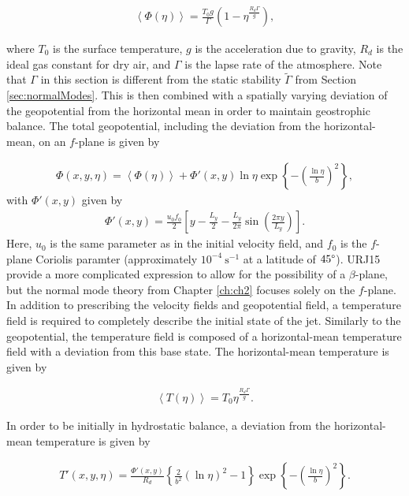 \begin{align}
\left\langle\Phi(\eta)\right\rangle = \frac{T_0 g}{\Gamma}\left(1 - \eta^{\frac{R_d \Gamma}{g}}\right),
\end{align}

where $T_0$ is the surface temperature, $g$ is the acceleration due to gravity, $R_d$ is the ideal gas constant for dry air, and $\Gamma$ is the lapse rate of the atmosphere. Note that $\Gamma$ in this section is different from the static stability $\tilde{\Gamma}$ from Section \ref{sec:normalModes}. This is then combined with a spatially varying deviation of the geopotential from the horizontal mean in order to maintain geostrophic balance. The total geopotential, including the deviation from the horizontal-mean, on an $f$-plane is given by

\begin{align}
\Phi(x,y,\eta) =\left\langle\Phi(\eta)\right\rangle +  \Phi'(x,y)\ln{\eta} \exp{\left\{ -\left(\frac{\ln{\eta}}{b}\right)^2\right\}},
\end{align}
with $\Phi'(x,y)$ given by
\begin{align}
\Phi'(x,y) = \frac{u_0 f_0}{2}\left[y - \frac{L_y}{2} - \frac{L_y}{2\pi} \sin{\left(\frac{2\pi y}{L_y}\right)}\right] .
\end{align}
Here, $u_0$ is the same parameter as in the initial velocity field, and $f_0$ is the $f$-plane Coriolis paramter (approximately $10^{-4} ~\text{s}^{-1}$ at a latitude of $45\degree$). URJ15 provide a more complicated expression to allow for the possibility of a $\beta$-plane, but the normal mode theory from Chapter \ref{ch:ch2} focuses solely on the $f$-plane.\\

In addition to prescribing the velocity fields and geopotential field, a temperature field is required to completely describe the initial state of the jet. Similarly to the geopotential, the temperature field is composed of a horizontal-mean temperature field with a deviation from this base state. The horizontal-mean temperature is given by

\begin{align}
\left\langle T(\eta)\right\rangle = T_0 \eta^{\frac{R_d \Gamma}{g}}.
\end{align}

In order to be initially in hydrostatic balance, a deviation from the horizontal-mean temperature is given by

\begin{align}
T'(x,y,\eta) = \frac{\Phi'(x,y)}{R_d} \left\{ \frac{2}{b^2}(\ln {\eta})^2 - 1\right\} \exp{\left\{-\left(\frac{\ln{\eta}}{b}\right)^2\right\} }.
\end{align}


